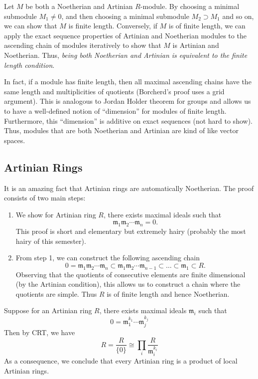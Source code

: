 Let $M$ be both a Noetherian and Artinian $R$-module. By choosing a minimal submodule $M_1 \neq 0$, and then choosing a minimal submodule $M_2 \supset M_1$ and so on, we can show that $M$ is finite length. Conversely, if $M$ is of finite length, we can apply the exact sequence properties of Artinian and Noetherian modules to the ascending chain of modules iteratively to show that $M$ is Artinian and Noetherian. Thus, \textit{being both Noetherian and Artinian is equivalent to the finite length condition}.

In fact, if a module has finite length, then all maximal ascending chains have the same length and multiplicities of quotients (Borcherd's proof uses a grid argument). This is analogous to Jordan Holder theorem for groups and allows us to have a well-defined notion of ``dimension'' for modules of finite length. Furthermore, this ``dimension'' is additive on exact sequences (not hard to show). Thus, modules that are both Noetherian and Artinian are kind of like vector spaces.

\subsection{Artinian Rings}
It is an amazing fact that Artinian rings are automatically Noetherian. The proof consists of two main steps:
\begin{enumerate}
    \item We show for Artinian ring $R$, there exists maximal ideals such that
    \[
        \mathfrak m_1 \mathfrak m_2 \cdots \mathfrak m_n = 0.
    \]
    This proof is short and elementary but extremely hairy (probably the most hairy of this semester).
    \item From step 1, we can construct the following ascending chain
    \[
        0 = \mathfrak m_1 \mathfrak m_2 \cdots \mathfrak m_n \subset 
        \mathfrak m_1 \mathfrak m_2 \cdots \mathfrak m_{n-1} \subset \dots \subset \mathfrak m_1 \subset R.
    \]
    Observing that the quotients of consecutive elements are finite dimensional (by the Artinian condition), this allows us to construct a chain where the quotients are simple. Thus $R$ is of finite length and hence Noetherian.
\end{enumerate}

Suppose for an Artinian ring $R$, there exists maximal ideals $\mathfrak m_i$ such that
\[
    0 = \mathfrak m_1^{k_1}\cdots\mathfrak m_j^{k_j}
\]
Then by CRT, we have
\[
    R = \frac{R}{\{0\}} \cong \prod_i \frac{R}{\mathfrak m_i^{k_i}}
\]
As a consequence, we conclude that every Artinian ring is a product of local Artinian rings.

